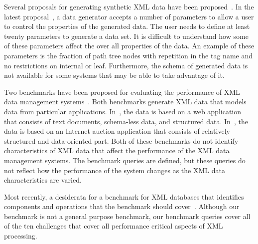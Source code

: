Several proposals for generating synthetic XML data have been
proposed~\cite{FK99, Aboulnaga01generating}. In the latest
proposal~\cite{Aboulnaga01generating}, a data generator accepts a
number of parameters to allow a user to control the properties of the
generated data.  The user needs to define at least twenty parameters
to generate a data set.  It is difficult to understand how some of
these parameters affect the over all properties of the data. An
example of these parameters is the fraction of path tree nodes with
repetition in the tag name and no restrictions on internal or leaf.
Furthermore, the schema of generated data is not available for some
systems that may be able to take advantage of it.

Two benchmarks have been proposed for evaluating the performance of
XML data management systems~\cite{xmach,xmark}.  Both benchmarks
generate XML data that models data from particular applications.
In~\cite{xmach}, the data is based on a web application that consists
of text documents, schema-less data, and structured
data. In~\cite{xmark}, the data is based on an Internet auction
application that consists of relatively structured and data-oriented
part.  Both of these benchmarks do not identify characteristics of XML
data that affect the performance of the XML data management systems.
The benchmark queries are defined, but these queries do not reflect
how the performance of the system changes as the XML data characteristics 
are varied.

Most recently, a desiderata for a benchmark for XML databases that
identifies components and operations that the benchmark should
cover~\cite{SIGMODRECORD01Bench}.  Although our benchmark is not a
general purpose benchmark, our benchmark queries cover all of the ten
challenges that cover all performance critical aspects of XML processing.



